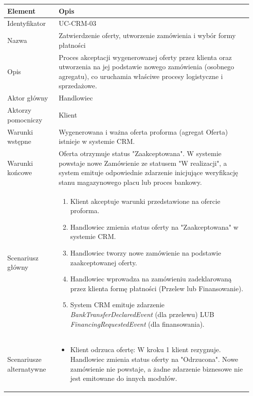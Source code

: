 \begin{longtable}{|p{4cm}|p{11cm}|}
\hline
\textbf{Element} & \textbf{Opis} \\
\hline

Identyfikator & UC-CRM-03 \\
\hline

Nazwa & Zatwierdzenie oferty, utworzenie zamówienia i wybór formy płatności \\
\hline

Opis & 
Proces akceptacji wygenerowanej oferty przez klienta oraz utworzenia na jej podstawie nowego zamówienia (osobnego agregatu), co uruchamia właściwe procesy logistyczne i sprzedażowe. \\
\hline

Aktor główny & Handlowiec \\
\hline

Aktorzy pomocniczy & Klient \\
\hline

Warunki wstępne & 
Wygenerowana i ważna oferta proforma (agregat Oferta) istnieje w systemie CRM. \\
\hline

Warunki końcowe & 
Oferta otrzymuje status "Zaakceptowana". W systemie powstaje nowe Zamówienie ze statusem "W realizacji", a system emituje odpowiednie zdarzenie inicjujące weryfikację stanu magazynowego placu lub proces bankowy. \\
\hline

Scenariusz główny & 
\begin{enumerate}
    \item Klient akceptuje warunki przedstawione na ofercie proforma.
    \item Handlowiec zmienia status oferty na "Zaakceptowana" w systemie CRM.
    \item Handlowiec tworzy nowe zamówienie na podstawie zaakceptowanej oferty.
    \item Handlowiec wprowadza na zamówieniu zadeklarowaną przez klienta formę płatności (Przelew lub Finansowanie).
    \item System CRM emituje zdarzenie \textit{BankTransferDeclaredEvent} (dla przelewu) LUB \textit{FinancingRequestedEvent} (dla finansowania).
\end{enumerate} \\
\hline

Scenariusze alternatywne & 
\begin{itemize}
    \item [A1] Klient odrzuca ofertę: W kroku 1 klient rezygnuje. Handlowiec zmienia status oferty na "Odrzucona". Nowe zamówienie nie powstaje, a żadne zdarzenie biznesowe nie jest emitowane do innych modułów.
\end{itemize} \\
\hline
\end{longtable}

